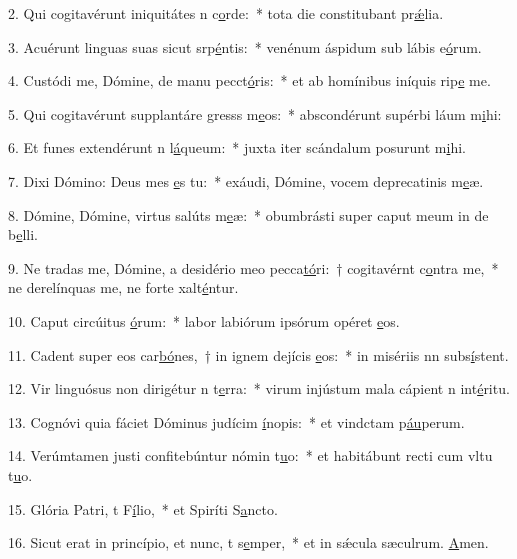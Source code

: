 2. Qui cogitavérunt iniquitátes n c\uline{o}rde:~* tota die constitubant pr\uline{ǽ}lia.\par 
3. Acuérunt linguas suas sicut srp\uline{é}ntis:~* venénum áspidum sub lábis e\uline{ó}rum.\par 
4. Custódi me, Dómine, de manu pecct\uline{ó}ris:~* et ab homínibus iníquis rip\uline{e} me.\par 
5. Qui cogitavérunt supplantáre gresss m\uline{e}os:~* abscondérunt supérbi láum m\uline{i}hi:\par 
6. Et funes extendérunt n l\uline{á}queum:~* juxta iter scándalum posurunt m\uline{i}hi.\par 
7. Dixi Dómino: Deus mes \uline{e}s tu:~* exáudi, Dómine, vocem deprecatinis m\uline{e}æ.\par 
8. Dómine, Dómine, virtus salúts m\uline{e}æ:~* obumbrásti super caput meum in de b\uline{e}lli.\par 
9. Ne tradas me, Dómine, a desidério meo pecca\uline{tó}ri:~† cogitavérnt c\uline{o}ntra me,~* ne derelínquas me, ne forte xalt\uline{é}ntur.\par 
10. Caput circúitus \uline{ó}rum:~* labor labiórum ipsórum opéret \uline{e}os.\par 
11. Cadent super eos car\uline{bó}nes,~† in ignem dejícis \uline{e}os:~* in misériis nn subs\uline{í}stent.\par 
12. Vir linguósus non dirigétur n t\uline{e}rra:~* virum injústum mala cápient n int\uline{é}ritu.\par 
13. Cognóvi quia fáciet Dóminus judícim \uline{í}nopis:~* et vindctam p\uline{áu}perum.\par 
14. Verúmtamen justi confitebúntur nómin t\uline{u}o:~* et habitábunt recti cum vltu t\uline{u}o.\par 
15. Glória Patri, t F\uline{í}lio,~* et Spiríti S\uline{a}ncto.\par 
16. Sicut erat in princípio, et nunc, t s\uline{e}mper,~* et in sǽcula sæculrum. \uline{A}men.\par 
